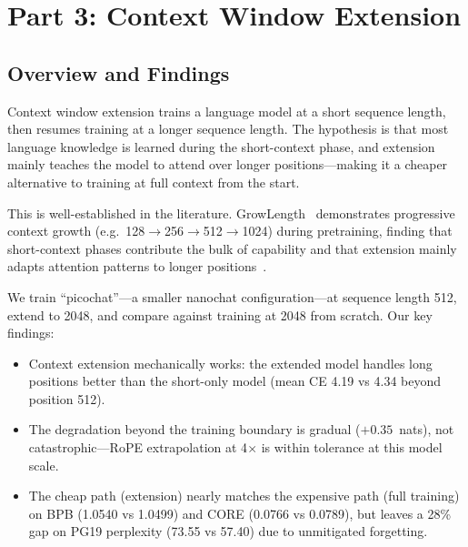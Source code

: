 
\graphicspath{{../p3/results/figures/}}

\section{Part 3: Context Window Extension}

\subsection{Overview and Findings}

Context window extension trains a language model at a short sequence length, then resumes training at a longer sequence length. The hypothesis is that most language knowledge is learned during the short-context phase, and extension mainly teaches the model to attend over longer positions---making it a cheaper alternative to training at full context from the start.

This is well-established in the literature. GrowLength~\cite{growlength} demonstrates progressive context growth (e.g.\ 128$\to$256$\to$512$\to$1024) during pretraining, finding that short-context phases contribute the bulk of capability and that extension mainly adapts attention patterns to longer positions~\cite{skyladder,prolong}.

We train ``picochat''---a smaller nanochat configuration---at sequence length 512, extend to 2048, and compare against training at 2048 from scratch. Our key findings:

\begin{itemize}
  \item Context extension mechanically works: the extended model handles long positions better than the short-only model (mean CE 4.19 vs 4.34 beyond position 512).
  \item The degradation beyond the training boundary is gradual ($+0.35$~nats), not catastrophic---RoPE extrapolation at 4$\times$ is within tolerance at this model scale.
  \item The cheap path (extension) nearly matches the expensive path (full training) on BPB (1.0540 vs 1.0499) and CORE (0.0766 vs 0.0789), but leaves a 28\% gap on PG19 perplexity (73.55 vs 57.40) due to unmitigated forgetting.
\end{itemize}

